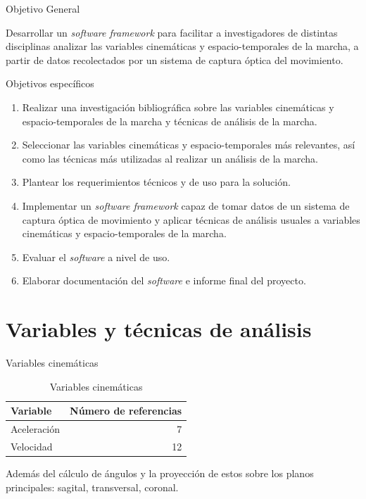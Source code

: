 \documentclass{beamer} %
\begin{document}
\begin{frame}{Objetivo General}
    \begin{block}{}
        Desarrollar un \emph{software framework} para facilitar a investigadores de distintas disciplinas analizar las variables cinemáticas y espacio-temporales de la marcha, a partir de datos recolectados por un sistema de captura óptica del movimiento.
    \end{block}
\end{frame}

\begin{frame}{Objetivos específicos}
    \begin{enumerate}
        \item Realizar una investigación bibliográfica sobre las variables cinemáticas y espacio-temporales de la marcha y técnicas de análisis de la marcha. 
        \item Seleccionar las variables cinemáticas y espacio-temporales más relevantes, así como las técnicas más utilizadas al realizar un análisis de la marcha.
        \item Plantear los requerimientos técnicos y de uso para la solución. 
        \item Implementar un \emph{software framework} capaz de tomar datos de un sistema de captura óptica de movimiento y aplicar técnicas de análisis usuales a variables cinemáticas y espacio-temporales de la marcha. 
        \item Evaluar el \emph{software} a nivel de uso.
        \item Elaborar documentación del \emph{software} e informe final del proyecto. 
    \end{enumerate}
\end{frame}

\section{Variables y técnicas de análisis}

\begin{frame}{Variables cinemáticas}
\begin{table}
    \centering
    \caption{Variables cinemáticas}
    \label{tab:cinematicas}
    \begin{tabular}{lr}
        \toprule
        Variable & Número de referencias  \\
        \midrule
        Aceleración & 7 \\
        Velocidad   & 12 \\
        \bottomrule
    \end{tabular}
\end{table}
Además del cálculo de ángulos y la proyección de estos sobre los planos principales: sagital, transversal, coronal. 
\end{frame}
\end{document}
